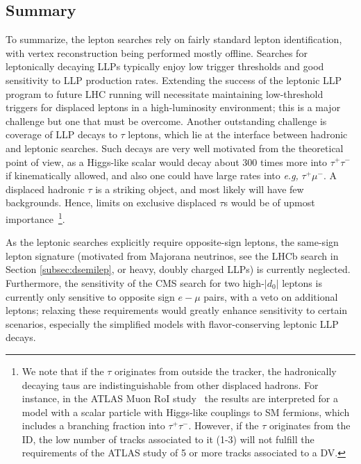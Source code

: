 \subsection{Summary}
\label{sec:leptonicsummary}

To summarize, the lepton searches rely on fairly standard lepton identification, with vertex reconstruction being performed mostly offline. Searches for leptonically decaying LLPs typically enjoy low trigger thresholds and good sensitivity to LLP production rates. Extending the success of the leptonic LLP program to future LHC running will necessitate maintaining low-threshold triggers for displaced leptons in a high-luminosity environment; this is a major challenge but one that must be overcome. Another  outstanding challenge  is coverage of LLP decays to $\tau$ leptons, which lie at the interface between hadronic and leptonic searches. Such decays are very well motivated from the theoretical point of view, as a Higgs-like scalar would decay about 300 times more into $\tau^+ \tau^-$ if kinematically allowed, and also one could have large rates into \emph{e.g,} $\tau^+ \mu^-$.   A displaced hadronic $\tau$ is a striking object, and most likely will have few backgrounds. Hence, limits on exclusive displaced $\tau$s would be of upmost importance~\footnote{We note that if the $\tau$ originates from outside the tracker, the hadronically decaying taus are indistinguishable from other displaced hadrons. For instance, in the ATLAS Muon RoI study~\cite{Aad:2015uaa} the results are interpreted for a model with a scalar particle with Higgs-like couplings to SM fermions, which includes a branching fraction into $\tau^+ \tau^-$. However, if the $\tau$ originates from the ID, the low number of tracks associated to it (1-3) will not fulfill the requirements of the ATLAS study of 5 or more tracks associated to a DV.}.

As the leptonic searches explicitly require opposite-sign leptons, the same-sign lepton signature (motivated from Majorana neutrinos, see the LHCb search in Section \ref{subsec:dsemilep}, or heavy, doubly charged LLPs) is currently neglected. Furthermore, the sensitivity of the CMS search for two high-$|d_0|$ leptons is currently only sensitive to opposite sign $e-\mu$ pairs, with a veto on additional leptons; relaxing these requirements would greatly enhance sensitivity to certain scenarios, especially the simplified models with flavor-conserving leptonic LLP decays.

